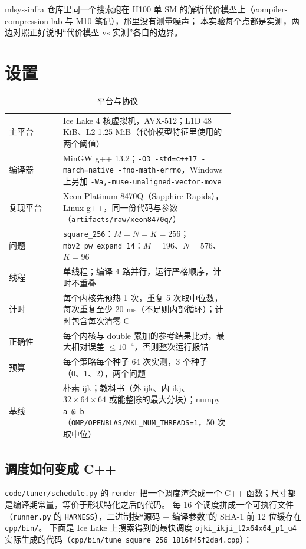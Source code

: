 \documentclass[11pt,a4paper]{ctexart}
\newcommand{\sk}[1]{\texttt{#1}}
\begin{document}
mlsys-infra 仓库里同一个搜索跑在 H100 单 SM 的解析代价模型上（compiler-compression lab 与 M10 笔记），那里没有测量噪声；
本实验每个点都是实测，两边对照正好说明“代价模型 vs 实测”各自的边界。

\section{设置}\label{sec:setup}

\begin{table}[H]
\centering\small
\caption{平台与协议}\label{tab:setup}
\begin{tabular}{lp{0.76\linewidth}}
\toprule
主平台 & Ice Lake 4 核虚拟机，AVX-512；L1D 48 KiB、L2 1.25 MiB（代价模型特征里使用的两个阈值） \\
编译器 & MinGW g++ 13.2；\texttt{-O3 -std=c++17 -march=native -fno-math-errno}，Windows 上另加 \texttt{-Wa,-muse-unaligned-vector-move} \\
复现平台 & Xeon Platinum 8470Q（Sapphire Rapids），Linux g++，同一份代码与参数（\texttt{artifacts/raw/xeon8470q/}） \\
问题 & \sk{square\_256}：$M=N=K=256$；\sk{mbv2\_pw\_expand\_14}：$M=196$、$N=576$、$K=96$ \\
线程 & 单线程；编译 4 路并行，运行严格顺序，计时不重叠 \\
计时 & 每个内核先预热 1 次，重复 5 次取中位数，每次重复至少 20 ms（不足则内部循环）；计时包含每次清零 C \\
正确性 & 每个内核与 double 累加的参考结果比对，最大相对误差 $\le 10^{-4}$，否则整次运行报错 \\
预算 & 每个策略每个种子 64 次实测，3 个种子（0、1、2），两个问题 \\
基线 & 朴素 ijk；教科书（外 ijk、内 ikj、$32\times64\times64$ 或能整除的最大分块）；numpy \texttt{a @ b}（\texttt{OMP/OPENBLAS/MKL\_NUM\_THREADS=1}，50 次取中位） \\
\bottomrule
\end{tabular}
\end{table}

\subsection{调度如何变成 C++}

\texttt{code/tuner/schedule.py} 的 \texttt{render} 把一个调度渲染成一个 C++ 函数；尺寸都是编译期常量，等价于形状特化之后的代码。
每 16 个调度拼成一个可执行文件（\texttt{runner.py} 的 \texttt{HARNESS}），二进制按“源码 + 编译参数”的 SHA-1 前 12 位缓存在 \texttt{cpp/bin/}。
下面是 Ice Lake 上搜索得到的最快调度 \sk{ojki\_ikji\_t2x64x64\_p1\_u4} 实际生成的代码（\texttt{cpp/bin/tune\_square\_256\_1816f45f2da4.cpp}）：
\end{document}
